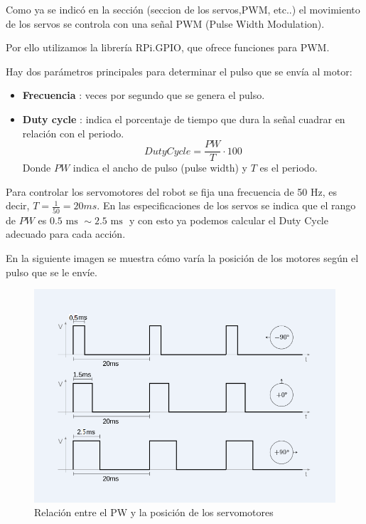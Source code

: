 \documentclass[twoside, 11pt]{epstfg}
\begin{document}
Como ya se indicó en la sección (seccion de los servos,PWM, etc..) el movimiento de los servos se controla con una señal PWM (Pulse Width Modulation).

Por ello utilizamos la librería RPi.GPIO, que ofrece funciones para PWM.

Hay dos parámetros principales para determinar el pulso que se envía al motor:
\begin{itemize}
	\item \textbf{Frecuencia} : veces por segundo que se genera el pulso.
	\item \textbf{Duty cycle} : indica el porcentaje de tiempo que dura la señal cuadrar en relación con el periodo.
	$$DutyCycle = \frac{PW}{T}\cdot 100$$
	Donde $PW$ indica el ancho de pulso (pulse width) y $T$ es el periodo.
	
\end{itemize}

Para controlar los servomotores del robot se fija una frecuencia de 50 Hz, es decir, $T = \frac{1}{50} = 20 ms$.
En las especificaciones de los servos se indica que el rango de $PW$ es $0.5 \text{ ms } \sim 2.5\text{ ms }$ y con esto ya podemos calcular el Duty Cycle adecuado para cada acción.

En la siguiente imagen se muestra cómo varía la posición de los motores según el pulso que se le envíe.

\begin{figure}[h!]
	\centerline{
		\mbox{\includegraphics[width=.80\textwidth]{images/PWMServos.png}}
	}
	\caption{Relación entre el PW y la posición de los servomotores}
	\label{figPWM}
\end{figure}
\end{document}
